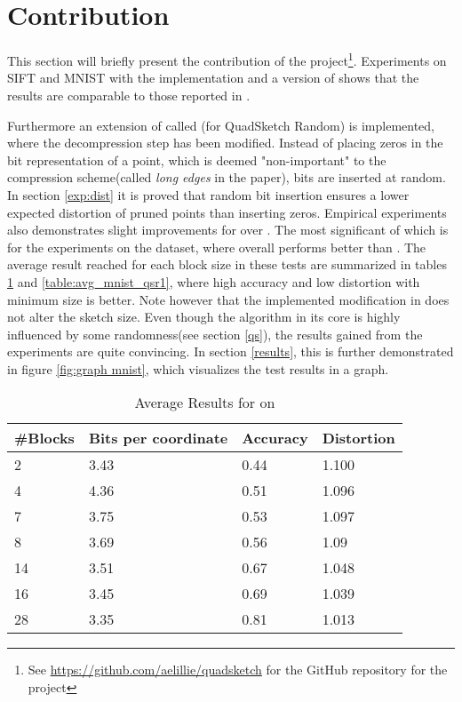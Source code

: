 \section{Contribution}
\label{contribution}
This section will briefly present the contribution of the project\footnote{See \url{https://github.com/aelillie/quadsketch} for the GitHub repository for the project}. Experiments on SIFT and MNIST with the \qs{} implementation and a version of \gr{} shows that the results are comparable to those reported in \cite{wagner17}. 

Furthermore an extension of \qs{} called \qsr{} (for QuadSketch Random) is implemented, where the decompression step has been modified. Instead of placing zeros in the bit representation of a point, which is deemed "non-important" to the compression scheme(called \textit{long edges} in the paper), bits are inserted at random. In section \ref{exp:dist} it is proved that random bit insertion ensures a lower expected distortion of pruned points than inserting zeros. Empirical experiments also demonstrates slight improvements for \qsr{} over \qs{}. The most significant of which is for the experiments on the \mnist{} dataset, where \qsr{} overall performs better than \qs{}. The average result reached for each block size in these tests are summarized in tables \ref{table:avg_mnist_qs1} and \ref{table:avg_mnist_qsr1}, where high accuracy and low distortion with minimum size is better. Note however that the implemented modification in \qsr{} does not alter the sketch size. Even though the algorithm in its core is highly influenced by some randomness(see section \ref{qs}), the results gained from the experiments are quite convincing. In section \ref{results}, this is further demonstrated in figure \ref{fig:graph mnist}, which visualizes the test results in a graph. 


\begin{table}[h]
	\centering
	\caption{Average Results for \qs{} on \mnist{}}
	\label{table:avg_mnist_qs1}
	\begin{tabular}{l l l l}
		\hline
		\#Blocks & Bits per coordinate & Accuracy  & Distortion \\ \hline
		2 & 3.43 & 0.44 & 1.100  \\
		4 & 4.36 & 0.51 & 1.096  \\
		7 & 3.75 & 0.53 & 1.097 \\
		8 & 3.69 & 0.56 & 1.09 \\
		14 & 3.51 & 0.67 & 1.048 \\
		16 & 3.45 & 0.69 & 1.039 \\
		28 & 3.35 & 0.81 & 1.013 \\
		\hline
	\end{tabular}
\end{table}

